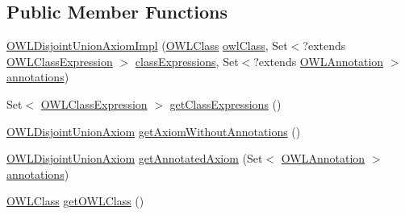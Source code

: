 \subsection*{Public Member Functions}
\begin{DoxyCompactItemize}
\item 
\hyperlink{classuk_1_1ac_1_1manchester_1_1cs_1_1owl_1_1owlapi_1_1_o_w_l_disjoint_union_axiom_impl_a5da0f18c85996f924dfe355739981c3b}{O\-W\-L\-Disjoint\-Union\-Axiom\-Impl} (\hyperlink{interfaceorg_1_1semanticweb_1_1owlapi_1_1model_1_1_o_w_l_class}{O\-W\-L\-Class} \hyperlink{classuk_1_1ac_1_1manchester_1_1cs_1_1owl_1_1owlapi_1_1_o_w_l_disjoint_union_axiom_impl_aa05e7c20893afc492e3433b47d7c2b3f}{owl\-Class}, Set$<$?extends \hyperlink{interfaceorg_1_1semanticweb_1_1owlapi_1_1model_1_1_o_w_l_class_expression}{O\-W\-L\-Class\-Expression} $>$ \hyperlink{classuk_1_1ac_1_1manchester_1_1cs_1_1owl_1_1owlapi_1_1_o_w_l_disjoint_union_axiom_impl_a49e1c4de2ba4a315e0d585ca0c8ce863}{class\-Expressions}, Set$<$?extends \hyperlink{interfaceorg_1_1semanticweb_1_1owlapi_1_1model_1_1_o_w_l_annotation}{O\-W\-L\-Annotation} $>$ \hyperlink{classuk_1_1ac_1_1manchester_1_1cs_1_1owl_1_1owlapi_1_1_o_w_l_axiom_impl_af6fbf6188f7bdcdc6bef5766feed695e}{annotations})
\item 
Set$<$ \hyperlink{interfaceorg_1_1semanticweb_1_1owlapi_1_1model_1_1_o_w_l_class_expression}{O\-W\-L\-Class\-Expression} $>$ \hyperlink{classuk_1_1ac_1_1manchester_1_1cs_1_1owl_1_1owlapi_1_1_o_w_l_disjoint_union_axiom_impl_ab1fe0c0ab8d436da68c19f1c69bf9aa0}{get\-Class\-Expressions} ()
\item 
\hyperlink{interfaceorg_1_1semanticweb_1_1owlapi_1_1model_1_1_o_w_l_disjoint_union_axiom}{O\-W\-L\-Disjoint\-Union\-Axiom} \hyperlink{classuk_1_1ac_1_1manchester_1_1cs_1_1owl_1_1owlapi_1_1_o_w_l_disjoint_union_axiom_impl_a47bdb91648f71ebe73dcf658166527ce}{get\-Axiom\-Without\-Annotations} ()
\item 
\hyperlink{interfaceorg_1_1semanticweb_1_1owlapi_1_1model_1_1_o_w_l_disjoint_union_axiom}{O\-W\-L\-Disjoint\-Union\-Axiom} \hyperlink{classuk_1_1ac_1_1manchester_1_1cs_1_1owl_1_1owlapi_1_1_o_w_l_disjoint_union_axiom_impl_ad1a18de9753557e7842f1de100e9fb7f}{get\-Annotated\-Axiom} (Set$<$ \hyperlink{interfaceorg_1_1semanticweb_1_1owlapi_1_1model_1_1_o_w_l_annotation}{O\-W\-L\-Annotation} $>$ \hyperlink{classuk_1_1ac_1_1manchester_1_1cs_1_1owl_1_1owlapi_1_1_o_w_l_axiom_impl_af6fbf6188f7bdcdc6bef5766feed695e}{annotations})
\item 
\hyperlink{interfaceorg_1_1semanticweb_1_1owlapi_1_1model_1_1_o_w_l_class}{O\-W\-L\-Class} \hyperlink{classuk_1_1ac_1_1manchester_1_1cs_1_1owl_1_1owlapi_1_1_o_w_l_disjoint_union_axiom_impl_a8773b41a6b0eac201b8696c9182db476}{get\-O\-W\-L\-Class} ()

\end{DoxyCompactItemize}
